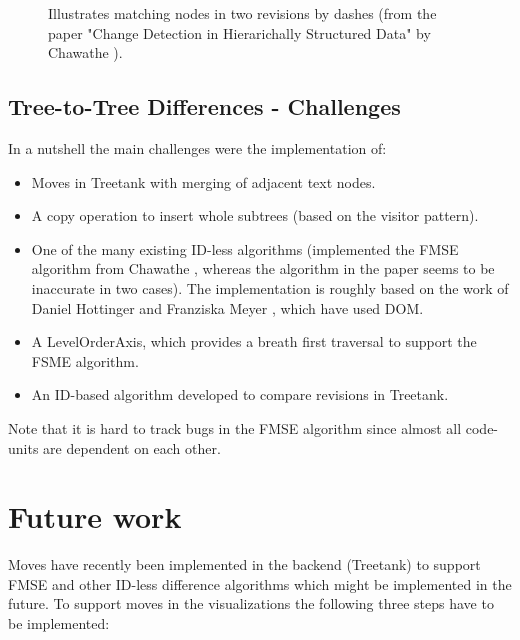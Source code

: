 \documentclass{llncs}
\begin{document}
\begin{figure}[htb]
\caption{\label{fig:matching} Illustrates matching nodes in two revisions by dashes (from the paper "Change Detection in Hierarichally Structured
Data" by Chawathe \cite{chawathe1996change}).}
\end{figure}

\subsection{Tree-to-Tree Differences - Challenges}
In a nutshell the main challenges were the implementation of:

\begin{itemize}
\item Moves in Treetank with merging of adjacent text nodes.
\item A copy operation to insert whole subtrees (based on the visitor pattern).
\item One of the many existing ID-less algorithms (implemented the FMSE algorithm from Chawathe \cite{chawathe1996change}, whereas the algorithm in the paper seems to be inaccurate in two cases). The implementation is roughly based on the work of Daniel Hottinger and Franziska Meyer \cite{hottinger}, which have used DOM.
\item A LevelOrderAxis, which provides a breath first traversal to support the FSME algorithm.
\item An ID-based algorithm developed to compare revisions in Treetank.
\end{itemize}

Note that it is hard to track bugs in the FMSE algorithm since almost all code-units are dependent on each other.

\section{Future work}
Moves have recently been implemented in the backend (Treetank) to support FMSE and other ID-less difference algorithms which might be implemented in the future. To support moves in the visualizations the following three steps have to be implemented:
\end{document}
